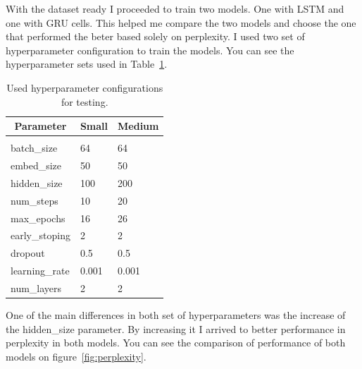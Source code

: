 \documentclass{article} %
\begin{document}
With the dataset ready I proceeded to train two models. One with LSTM and one
with GRU cells. This helped me compare the two models and choose the one that
performed the beter based solely on perplexity. I used two set of hyperparameter
configuration to train the models. You can see the hyperparameter sets used in
Table~\ref{table:hyperparameters}.

\begin{table}[h]
\caption{Used hyperparameter configurations for testing.}
\label{table:hyperparameters}
\centering
\begin{tabular}{lll}
\multicolumn{1}{c}{\bf Parameter}  &\multicolumn{1}{c}{\bf Small}
&\multicolumn{1}{c}{\bf Medium}
\\ \hline \\
batch\_size         &64         &64 \\
embed\_size         &50         &50 \\
hidden\_size        &100        &200 \\
num\_steps          &10         &20 \\
max\_epochs         &16         &26 \\
early\_stoping      &2          &2 \\
dropout             &0.5        &0.5 \\
learning\_rate      &0.001      &0.001 \\
num\_layers         &2          &2 \\
\end{tabular}
\end{table}

One of the main differences in both set of hyperparameters was the increase of
the hidden\_size parameter. By increasing it I arrived to better performance in
perplexity in both models. You can see the comparison of performance of both
models on figure~\ref{fig:perplexity}.
\end{document}

